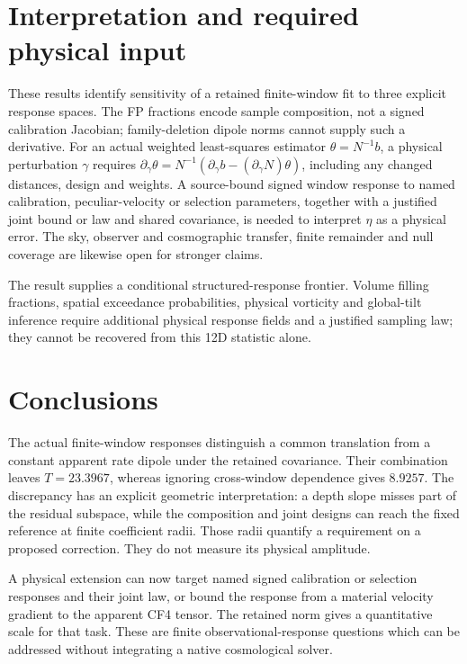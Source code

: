 \documentclass[aps,prd,reprint,onecolumn,superscriptaddress,nofootinbib]{revtex4-2}
\begin{document}
\section{Interpretation and required physical input}

These results identify sensitivity of a retained finite-window fit to three explicit response spaces. The FP fractions encode sample composition, not a signed calibration Jacobian; family-deletion dipole norms cannot supply such a derivative. For an actual weighted least-squares estimator $\theta=N^{-1}b$, a physical perturbation $\gamma$ requires $\partial_\gamma\theta=N^{-1}(\partial_\gamma b-(\partial_\gamma N)\theta)$, including any changed distances, design and weights. A source-bound signed window response to named calibration, peculiar-velocity or selection parameters, together with a justified joint bound or law and shared covariance, is needed to interpret $\eta$ as a physical error. The sky, observer and cosmographic transfer, finite remainder and null coverage are likewise open for stronger claims.

The result supplies a conditional structured-response frontier. Volume filling fractions, spatial exceedance probabilities, physical vorticity and global-tilt inference require additional physical response fields and a justified sampling law; they cannot be recovered from this 12D statistic alone.

\section{Conclusions}
The actual finite-window responses distinguish a common translation from a constant apparent rate dipole under the retained covariance. Their combination leaves $T=23.3967$, whereas ignoring cross-window dependence gives $8.9257$. The discrepancy has an explicit geometric interpretation: a depth slope misses part of the residual subspace, while the composition and joint designs can reach the fixed reference at finite coefficient radii. Those radii quantify a requirement on a proposed correction. They do not measure its physical amplitude.

A physical extension can now target named signed calibration or selection responses and their joint law, or bound the response from a material velocity gradient to the apparent CF4 tensor. The retained norm gives a quantitative scale for that task. These are finite observational-response questions which can be addressed without integrating a native cosmological solver.
\end{document}

